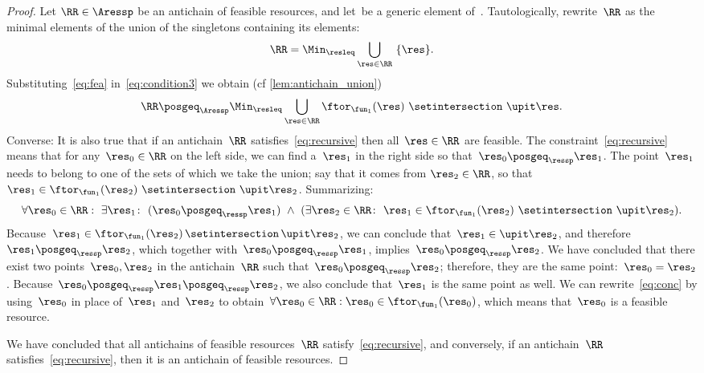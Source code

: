 \begin{proof}
    Let $\RR\in\Aressp$ be an antichain of feasible resources, and let~\res be a generic element of~\ressp.
    Tautologically, rewrite~$\RR$ as the minimal elements of the union of the singletons containing its elements:
    \begin{equation}
        \RR=\Min_{\resleq}\bigcup_{\res\in\RR}\ \{\res\}.
        \label{eq:condition3}
    \end{equation}
    Substituting~\cref{eq:fea} in~\cref{eq:condition3} we obtain (cf
    \cref{lem:antichain_union})
    \begin{equation}
        \RR\posgeq_{\Aressp}\Min_{\resleq}\bigcup_{\res\in\RR}\ftor_{\fun_{1}}(\res)\ \setintersection\ \upit\res.
        \label{eq:recursive}
    \end{equation}
    Converse: It is also true that if an antichain~$\RR$ satisfies~\cref{eq:recursive} then all~$\res\in\RR$ are feasible.
    The constraint~\cref{eq:recursive} means that for any~$\res_{0}\in\RR$ on the left side, we can find a~$\res_{1}$ in the right side so that~$\res_{0}\posgeq_{\ressp}\res_{1}$.
    The point~$\res_{1}$ needs to belong to one of the sets of which we take the union; say that it comes from $\res_{2}\in\RR$, so that $\res_{1}\in\ftor_{\fun_{1}}(\res_{2})\ \setintersection\ \upit\res_{2}$.
    Summarizing:
    \begin{equation}
        \forall\res_{0}\in\RR:\ \exists\res_{1}\colon\ (\res_{0}\posgeq_{\ressp}\res_{1})\ \wedge\ (\exists\res_{2}\in\RR\colon\ \res_{1}\in\ftor_{\fun_{1}}(\res_{2})\ \setintersection\ \upit\res_{2}).
        \label{eq:conc}
    \end{equation}
    Because~$\res_{1}\in\ftor_{\fun_{1}}(\res_{2})\,\setintersection\,\upit\res_{2}$, we can conclude that~$\res_{1}\in\upit\res_{2}$, and therefore~$\res_{1}\posgeq_{\ressp}\res_{2}$, which together with~$\res_{0}\posgeq_{\ressp}\res_{1}$, implies~$\res_{0}\posgeq_{\ressp}\res_{2}$.
    We have concluded that there exist two points~$\res_{0},\res_{2}$ in the antichain~$\RR$ such that~$\res_{0}\posgeq_{\ressp}\res_{2}$; therefore, they are the same point:~$\res_{0}=\res_{2}$.
    Because~$\res_{0}\posgeq_{\ressp}\res_{1}\posgeq_{\ressp}\res_{2}$, we also conclude that~$\res_{1}$ is the same point as well.
    We can rewrite~\cref{eq:conc} by using~$\res_{0}$ in place of~$\res_{1}$ and~$\res_{2}$ to obtain~$\forall\res_{0}\in\RR:\res_{0}\in\ftor_{\fun_{1}}(\res_{0})$,
    which means that~$\res_{0}$ is a feasible resource.

    We have concluded that all antichains of feasible resources~$\RR$ satisfy~\cref{eq:recursive}, and conversely, if an antichain~$\RR$ satisfies~\cref{eq:recursive}, then it is an antichain of feasible resources.


\end{proof}
